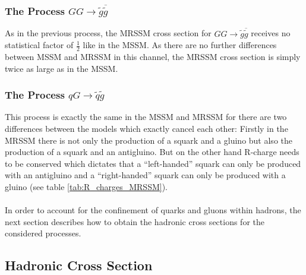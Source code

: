 \subsubsection*{The Process $GG \to \tilde{g}\overline{\tilde{g}}$}
As in the previous process, the MRSSM cross section for $GG \to \tilde{g}\overline{\tilde{g}}$ receives no statistical factor of $\frac{1}{2}$ like in the MSSM. As there are no further differences between MSSM and MRSSM in this channel, the MRSSM cross section is simply twice as large as in the MSSM.

\subsubsection*{The Process $q G \to \tilde{q} \tilde{g}$}
This process is exactly the same in the MSSM and MRSSM for there are two differences between the models which exactly cancel each other: Firstly in the MRSSM there is not only the production of a squark and a gluino but also the production of a squark and an antigluino. But on the other hand R-charge needs to be conserved which dictates that a ``left-handed'' squark can only be produced with an antigluino and a ``right-handed'' squark can only be produced with a gluino (see table \ref{tab:R_charges_MRSSM}).
\\ 
\\
In order to account for the confinement of quarks and gluons within hadrons, the next section describes how to obtain the hadronic cross sections for the considered processes.



\subsection{Hadronic Cross Section}

